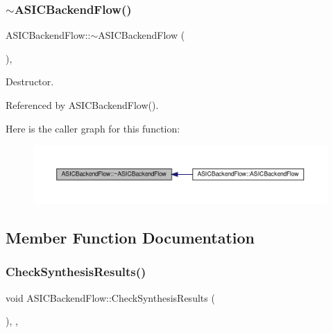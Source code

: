 \subsubsection{\texorpdfstring{$\sim$\+A\+S\+I\+C\+Backend\+Flow()}{~ASICBackendFlow()}}
{\footnotesize\ttfamily A\+S\+I\+C\+Backend\+Flow\+::$\sim$\+A\+S\+I\+C\+Backend\+Flow (\begin{DoxyParamCaption}{ }\end{DoxyParamCaption})\hspace{0.3cm}{\ttfamily [override]}, {\ttfamily [default]}}



Destructor. 



Referenced by A\+S\+I\+C\+Backend\+Flow().

Here is the caller graph for this function\+:
\nopagebreak
\begin{figure}[H]
\begin{center}
\leavevmode
\includegraphics[width=350pt]{d2/d69/classASICBackendFlow_abc8ca0ae73028f5617092d16f147f1e8_icgraph}
\end{center}
\end{figure}


\subsection{Member Function Documentation}
\mbox{\label{classASICBackendFlow_a1c6c74532caa4054624b4ffeac49114f}} 
\subsubsection{\texorpdfstring{Check\+Synthesis\+Results()}{CheckSynthesisResults()}}
{\footnotesize\ttfamily void A\+S\+I\+C\+Backend\+Flow\+::\+Check\+Synthesis\+Results (\begin{DoxyParamCaption}{ }\end{DoxyParamCaption})\hspace{0.3cm}{\ttfamily [override]}, {\ttfamily [private]}, {\ttfamily [virtual]}}



